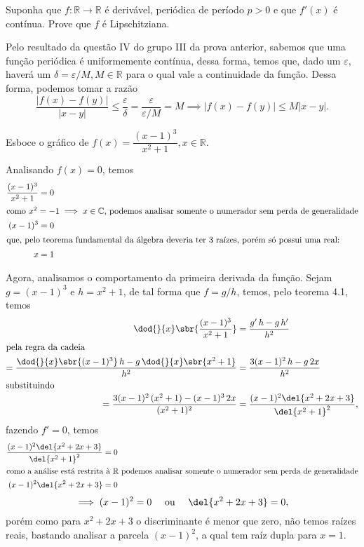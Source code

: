 \documentclass{IMTexam}
\begin{document}
	\begin{questions}
		\question Suponha que $ f:\mathbb{R}\longrightarrow\mathbb{R} $ é derivável, periódica de período $ p>0 $ e que $ f'(x) $ é contínua. Prove que $ f $ é Lipschitziana.
		
		\begin{solution}
			Pelo resultado da questão IV do grupo III da prova anterior, sabemos que uma função periódica é uniformemente contínua, dessa forma, temos que, dado um $\varepsilon$, haverá um $ \delta=\varepsilon/M,M\in\mathbb{R} $ para o qual vale a continuidade da função. Dessa forma, podemos tomar a razão
			\[ \dfrac{|f(x)-f(y)|}{|x-y|}\leqslant\dfrac{\varepsilon}{\delta}=\dfrac{\varepsilon}{\varepsilon/M}=M\implies|f(x)-f(y)|\leqslant M|x-y| . \]
			
			\hfill\qedsymbol
		\end{solution}
		
		\question Esboce o gráfico de $ f(x)=\dfrac{(x-1)^{3}}{x^{2}+1},x\in\mathbb{R} $.
		
		\begin{solution}
			Analisando $ f(x)=0 $, temos
			\begin{align*}
				\dfrac{(x-1)^{3}}{x^{2}+1}&=0\\
				\intertext{como $ x^{2}=-1\implies x\in\mathbb{C} $, podemos analisar somente o numerador sem perda de generalidade}
				(x-1)^{3}&=0\\
				\intertext{que, pelo teorema fundamental da álgebra deveria ter 3 raízes, porém só possui uma real:}
				x&=1
			\end{align*}
		
			Agora, analisamos o comportamento da primeira derivada da função. Sejam $ g=(x-1)^{3} $ e $ h=x^{2}+1 $, de tal forma que $ f=g/h $, temos, pelo teorema 4.1, temos
			\begin{align*}
				\dod{}{x}\sbr{\dfrac{(x-1)^{3}}{x^{2}+1}}&=\dfrac{g'\,h-g\,h'}{h^{2}}\\
				\intertext{pela regra da cadeia}
				=\dfrac{\dod{}{x}\sbr{(x-1)^{3}}\,h-g\,\dod{}{x}\sbr{x^{2}+1}}{h^{2}}&=\dfrac{3(x-1)^{2}\,h-g\,2x}{h^{2}}\\
				\intertext{substituindo}
				=\dfrac{3(x-1)^{2}\,(x^{2}+1)-(x-1)^{3}\,2x}{(x^{2}+1)^{2}}&=\dfrac{(x-1)^{2}\del{x^{2}+2x+3}}{\del{x^{2}+1}^{2}},
			\end{align*}
			fazendo $ f'=0 $, temos
			\begin{align*}
				\dfrac{(x-1)^{2}\del{x^{2}+2x+3}}{\del{x^{2}+1}^{2}}&=0\\
				\intertext{como a análise está restrita à $ \mathbb{R} $ podemos analisar somente o numerador sem perda de generalidade}
				(x-1)^{2}\del{x^{2}+2x+3}&=0
			\end{align*}
			\[ \implies (x-1)^{2}=0 \quad\text{ ou }\quad\del{x^{2}+2x+3}=0, \]
			porém como para $ x^{2}+2x+3 $ o discriminante é menor que zero, não temos raízes reais, bastando analisar a parcela $ (x-1)^{2} $, a qual tem raíz dupla para $ x=1 $.
			

\end{solution}
\end{questions}
\end{document}
